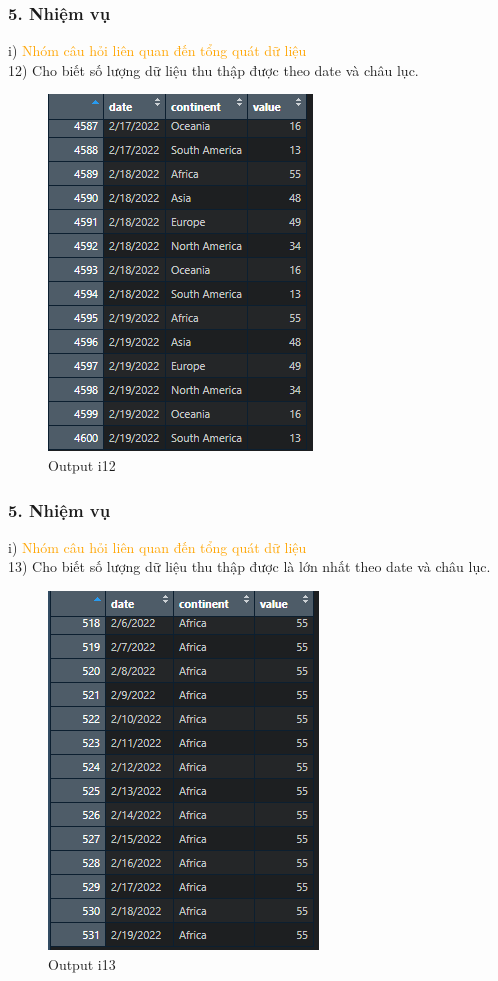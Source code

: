 \documentclass[english,10pt,table]{beamer}
\begin{document}
\begin{frame}[fragile]
\frametitle{5.  Nhiệm vụ}
	i) \textcolor{orange}{Nhóm câu hỏi liên quan đến tổng quát dữ liệu}\\
		12) Cho biết số lượng dữ liệu thu thập được theo date và châu lục.
\begin{figure}[h!]
	\begin{center}
		    \includegraphics[scale = 0.5]{Images/I/I12.png}
		            \caption{Output i12}
		\end{center}
		\end{figure}
\end{frame}

\begin{frame}[fragile]
\frametitle{5.  Nhiệm vụ}
	i) \textcolor{orange}{Nhóm câu hỏi liên quan đến tổng quát dữ liệu}\\
	13) Cho biết số lượng dữ liệu thu thập được là lớn nhất theo date và châu lục.
	\begin{figure}[h!]
	\begin{center}
		    \includegraphics[scale = 0.4]{Images/I/I13.png}
		            \caption{Output i13}
		\end{center}
		\end{figure}
\end{frame}
\end{document}
